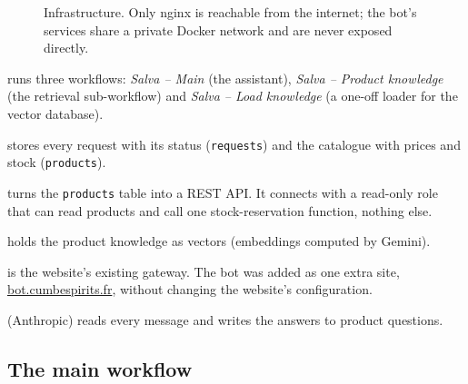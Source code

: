 \documentclass[11pt,a4paper]{article}
\newcommand{\nd}[1]{\emph{#1}}             %
\newcommand{\st}[1]{\texttt{#1}}           %
\begin{document}
\begin{figure}[htbp]
\caption{Infrastructure. Only nginx is reachable from the internet; the bot's services share a
private Docker network and are never exposed directly.}
\label{fig:infra}
\end{figure}

\begin{description}[leftmargin=0pt, itemsep=0.3em]
  \item[n8n] runs three workflows: \nd{Salva -- Main} (the assistant), \nd{Salva -- Product
        knowledge} (the retrieval sub-workflow) and \nd{Salva -- Load knowledge} (a one-off
        loader for the vector database).
  \item[PostgreSQL] stores every request with its status (\st{requests}) and the catalogue with
        prices and stock (\st{products}).
  \item[PostgREST] turns the \st{products} table into a REST API. It connects with a read-only
        role that can read products and call one stock-reservation function, nothing else.
  \item[Qdrant] holds the product knowledge as vectors (embeddings computed by Gemini).
  \item[nginx] is the website's existing gateway. The bot was added as one extra site,
        \url{bot.cumbespirits.fr}, without changing the website's configuration.
  \item[Claude] (Anthropic) reads every message and writes the answers to product questions.
\end{description}

\subsection{The main workflow}
\end{document}

